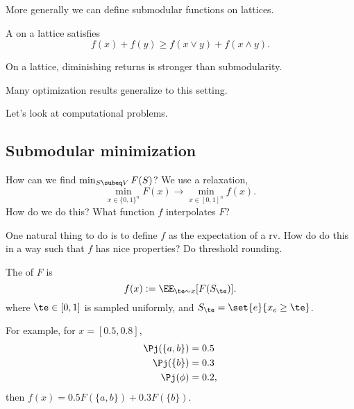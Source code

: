 More generally we can define submodular functions on lattices.
\begin{df}
A  on a lattice satisfies
$$
f(x)+f(y) \ge f(x\vee y) + f(x\wedge y).
$$
\end{df}
On a lattice, diminishing returns is stronger than submodularity.

Many optimization results generalize to this setting.

 
 Let's look at computational problems.
 \subsection{Submodular minimization}
 
 How can we find $\min_{S\subeq V}F(S)$? We use a relaxation, 
 $$
 \min_{x\in \{0,1\}^n} F(x) \to \min_{x\in [0,1]^n} f(x).
 $$
How do we do this? What function $f$ interpolates $F$?

One natural thing to do is to define $f$ as the expectation of a rv. 
How do do this in a way such that $f$ has nice properties?
Do threshold rounding. %
\begin{df}
The  of $F$ is 
$$
f(x):=\EE_{\te\sim x} [F(S_\te)].
$$
where $\te\in [0,1]$ is sampled uniformly, and $S_\te = \set{e}{x_e\ge \te}$.
\end{df}

For example, for $x=[0.5, 0.8]$,
\begin{align}
\Pj(\{a,b\}) &= 0.5\\
\Pj(\{b\}) &=0.3\\
\Pj(\phi) &=0.2,
\end{align}
then $f(x) = 0.5F(\{a,b\})+ 0.3F(\{b\})$.


